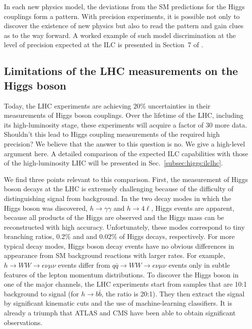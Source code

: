 In each new physics model, the  deviations from the SM predictions for the Higgs couplings form a pattern.  With precision experiments, it is possible not only to discover the existence of new physics but also to read the pattern and gain clues as to the way forward.   A worked example of such model discrimination at the level of precision expected at the ILC  is presented in
Section~7 of  \cite{Barklow:2017suo}.


\subsection{Limitations of the LHC measurements on the Higgs boson}

Today, the LHC experiments are achieving 20\% uncertainties in their measurements of Higgs boson couplings.   Over the lifetime of the LHC, including its high-luminosity stage, these experiments will acquire a factor of 30 more data.   Shouldn't this lead to Higgs coupling measurements of the required high precision?  We believe that the answer to this question is no.   We give a high-level argument here. A detailed comparison of the expected ILC capabilities with those of the high-luminosity LHC will be presented in Sec.~\ref{subsec:higgs:ilclhc}.

We find three points relevant to this comparison.  First, the measurement of Higgs boson 
decays at the LHC is extremely challenging because of the difficulty of distinguishing 
signal from background.
In the two decay modes in which the Higgs boson was discovered, $h\to \gamma\gamma$ and $h\to 4\ell$, Higgs events are apparent, because all products of the Higgs are observed and the Higgs mass can be reconstructed with high accuracy.  Unfortunately, these modes correspond to tiny branching ratios,  0.2\% and and 0.02\% of Higgs decays, respectively.  For more typical decay  modes, Higgs boson decay events have no obvious differences in appearance from SM background reactions with larger rates.   For example, $h\to WW\to e\nu \mu \nu $ events differ from $q\bar q\to WW \to  e\nu \mu \nu $ events only in subtle features of the lepton momentum distributions.  To discover the Higgs boson in one of the major channels, the LHC experiments start from samples that are 10:1 background to signal (for $h\to b\bar b$, the ratio is 20:1). They then  extract the signal by significant kinematic cuts and the use of machine-learning classifiers.  It is already a triumph that ATLAS and CMS have been able to obtain significant observations. 

